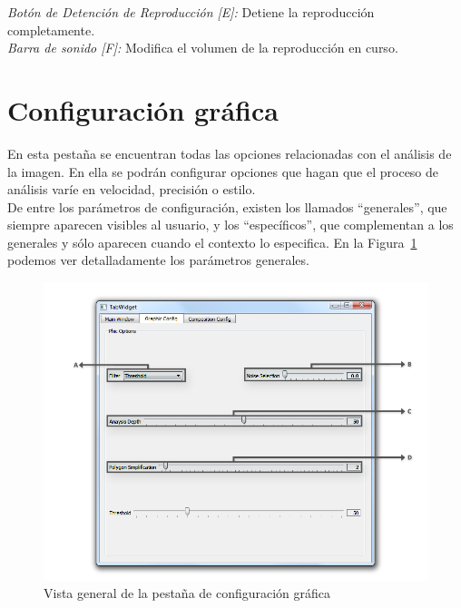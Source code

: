 		\color{blue}\noindent\textit{Botón de Detención de Reproducción [E]:}\color{black} Detiene la reproducción completamente.\\
		
		\color{blue}\noindent\textit{Barra de sonido [F]:}\color{black} Modifica el volumen de la reproducción en curso.

		
	\section{Configuración gráfica}
		En esta pestaña se encuentran todas las opciones relacionadas con el análisis de la imagen. En ella se podrán configurar opciones que hagan que el proceso de análisis varíe en velocidad, precisión o estilo.\\
		
		De entre los parámetros de configuración, existen los llamados ``generales'', que siempre aparecen visibles al usuario, y los ``específicos'', que complementan a los generales y sólo aparecen cuando el contexto lo especifica. En la Figura~\ref{fig:interfazgraphic} podemos ver detalladamente los parámetros generales.\\
		
		\begin{figure}[htbp]
		\centering
		\hspace*{-0.9in}
		\includegraphics[scale=0.57]{graphics/interfazgraphic.png}
		\caption{Vista general de la pestaña de configuración gráfica}
		\label{fig:interfazgraphic}
		\end{figure}
		
